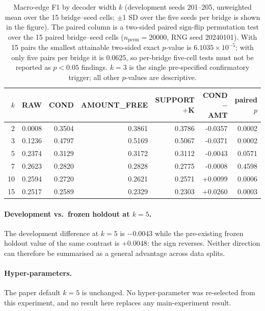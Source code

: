 \begin{table}[t]
\centering
\small
\begin{tabular}{rrrrrrr}
\hline
$k$ & RAW & COND & AMOUNT\_FREE & SUPPORT$+$K & COND $-$ AMT & paired $p$ \\
\hline
2 & 0.0008 & 0.3504 & 0.3861 & 0.3786 & -0.0357 & 0.0002 \\
3 & 0.1236 & 0.4797 & 0.5169 & 0.5067 & -0.0371 & 0.0002 \\
5 & 0.2374 & 0.3129 & 0.3172 & 0.3112 & -0.0043 & 0.0571 \\
7 & 0.2623 & 0.2820 & 0.2828 & 0.2775 & -0.0008 & 0.4598 \\
10 & 0.2594 & 0.2720 & 0.2621 & 0.2571 & +0.0099 & 0.0006 \\
15 & 0.2517 & 0.2589 & 0.2329 & 0.2303 & +0.0260 & 0.0003 \\
\hline
\end{tabular}
\caption{Macro-edge F1 by decoder width $k$ (development seeds 201--205, unweighted mean
over the 15 bridge--seed cells; $\pm$1 SD over the five seeds per bridge is shown in the
figure). The paired column is a two-sided paired sign-flip permutation test over the 15
paired bridge--seed cells ($n_{\mathrm{perm}} = 20000$, RNG seed 20240101).
With 15 pairs the smallest attainable two-sided exact $p$-value is $6.1035\times10^{-5}$;
with only five pairs per bridge it is $0.0625$, so per-bridge five-cell tests must not be
reported as $p<0.05$ findings. $k=3$ is the single pre-specified confirmatory trigger; all
other $p$-values are descriptive.}
\end{table}

\paragraph{Development vs.\ frozen holdout at $k=5$.}
The development difference at $k=5$ is $-0.0043$ while the pre-existing frozen
holdout value of the same contrast is $+0.0048$: the sign reverses. Neither
direction can therefore be summarised as a general advantage across data splits.

\paragraph{Hyper-parameters.}
The paper default $k=5$ is unchanged. No hyper-parameter was re-selected from this
experiment, and no result here replaces any main-experiment result.
